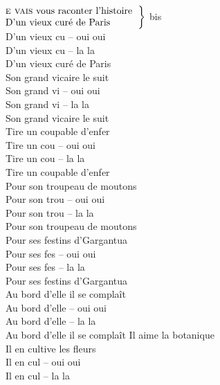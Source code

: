 
$\left.\begin{tabular}{l}
\hspace{-0.4cm}
\textsc{e vais} vous raconter l'histoire
\\
\hspace{-0.4cm}
D'un vieux curé de Paris
\end{tabular}\right\rbrace$ bis
\\D'un vieux cu -- oui oui
\\D'un vieux cu -- la la
\\D'un vieux curé de Paris
\\
{Son grand vicaire le suit}
\\Son grand vi -- oui oui
\\Son grand vi -- la la
\\Son grand vicaire le suit
\\
{Tire un coupable d'enfer}
\\Tire un cou -- oui oui
\\Tire un cou -- la la
\\Tire un coupable d'enfer
\\
{Pour son troupeau de moutons}
\\Pour son trou -- oui oui
\\Pour son trou -- la la
\\Pour son troupeau de moutons
\\
{Pour ses festins d'Gargantua}
\\Pour ses fes -- oui oui
\\Pour ses fes -- la la
\\Pour ses festins d'Gargantua
\\
{Au bord d'elle il se complaît}
\\Au bord d'elle -- oui oui
\\Au bord d'elle -- la la
\\Au bord d'elle il se complaît
\breakpage
Il aime la botanique
\\Il en cultive les fleurs
\\Il en cul -- oui oui
\\Il en cul -- la la

